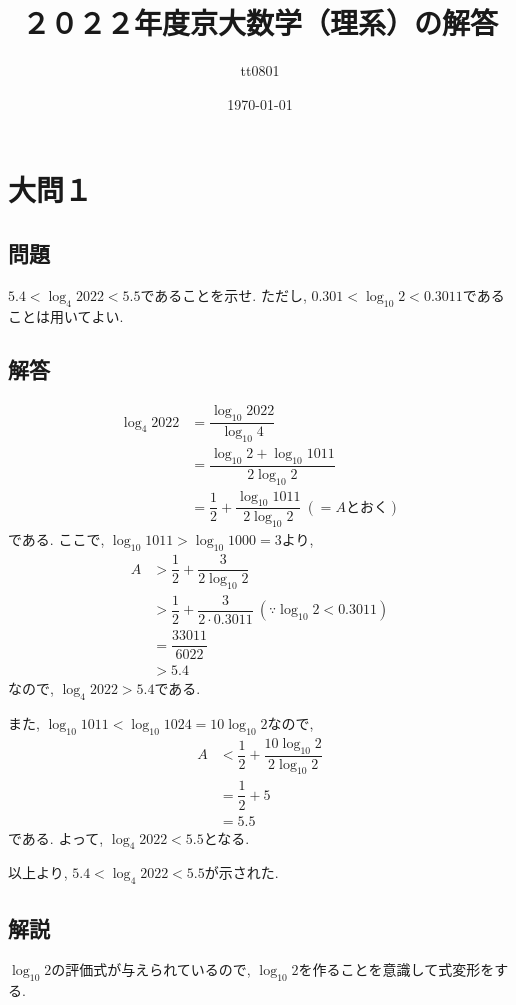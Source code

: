 \documentclass[dvipdfmx,a4paper]{jsarticle}
\title{２０２２年度京大数学（理系）の解答}
\author{tt0801}
\date{\today}
\begin{document}
    \maketitle
    \section{大問１}
    \subsection{問題}
    $5.4 < \log_4 2022 < 5.5$であることを示せ. ただし, $0.301 < \log_{10} 2 < 0.3011$であることは用いてよい. 


    \subsection{解答}
    \begin{align*}
        \log_4 2022 &= \dfrac{\log_{10} 2022}{\log_{10} 4} \\
            &= \dfrac{\log_{10} 2 + \log_{10} 1011}{2\log_{10} 2} \\
            &= \dfrac{1}{2} + \dfrac{\log_{10} 1011}{2\log_{10} 2} \ (=A \mathrm{とおく})
    \end{align*}
    である. ここで, $\log_{10} 1011 > \log_{10} 1000 = 3$より, 
    \begin{align*}
        A & > \dfrac{1}{2} + \dfrac{3}{2\log_{10} 2} \\
        & > \dfrac{1}{2} + \dfrac{3}{2\cdot 0.3011} \ (\because \log_{10} 2 < 0.3011)\\
        &= \dfrac{33011}{6022} \\
        &> 5.4
    \end{align*}
    なので, $\log_4 2022 > 5.4$である. 
    
    また, $\log_{10} 1011 < \log_{10} 1024 = 10 \log_{10} 2$なので, 
    \begin{align*}
        A & < \dfrac{1}{2} + \dfrac{10 \log_{10} 2}{2\log_{10} 2} \\
        &= \dfrac{1}{2} + 5\\
        &= 5.5
    \end{align*}
    である. よって, $\log_4 2022 < 5.5$となる. 

    以上より, $5.4 < \log_4 2022 < 5.5$が示された. 


    \subsection{解説}
    $\log_{10} 2$の評価式が与えられているので, $\log_{10} 2$を作ることを意識して式変形をする. 
\end{document}
